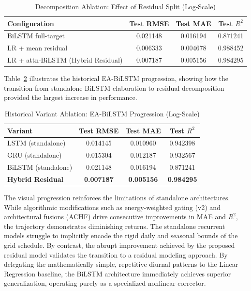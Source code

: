 \documentclass{ieeeaccess}
\begin{document}
\begin{table}[!t]
\caption{Decomposition Ablation: Effect of Residual Split (Log-Scale)}
\label{tab:ablation_decomp}
\centering
\begin{tabular}{lccc}
\toprule
Configuration & Test RMSE & Test MAE & Test $R^2$ \\
\midrule
BiLSTM full-target & 0.021148 & 0.016194 & 0.871241 \\
LR + mean residual & 0.006333 & 0.004678 & 0.988452 \\
LR + attn-BiLSTM (Hybrid Residual) & 0.007187 & 0.005156 & 0.984295 \\
\bottomrule
\end{tabular}
\end{table}

Table~\ref{tab:variant_ablation} illustrates the historical EA-BiLSTM progression, showing how the transition from standalone BiLSTM elaboration to residual decomposition provided the largest increase in performance.

\begin{table}[!t]
\caption{Historical Variant Ablation: EA-BiLSTM Progression (Log-Scale)}
\label{tab:variant_ablation}
\centering
\begin{tabular}{lccc}
\toprule
Variant & Test RMSE & Test MAE & Test $R^2$ \\
\midrule
LSTM (standalone) & 0.014145 & 0.010960 & 0.942398 \\
GRU (standalone) & 0.015304 & 0.012187 & 0.932567 \\
BiLSTM (standalone) & 0.021148 & 0.016194 & 0.871241 \\
\textbf{Hybrid Residual} & \textbf{0.007187} & \textbf{0.005156} & \textbf{0.984295} \\
\bottomrule
\end{tabular}
\end{table}

The visual progression reinforces the limitations of standalone architectures. While algorithmic modifications such as energy-weighted gating (v2) and architectural fusions (ACHF) drive consecutive improvements in MAE and $R^2$, the trajectory demonstrates diminishing returns. The standalone recurrent models struggle to implicitly encode the rigid daily and seasonal bounds of the grid schedule. By contrast, the abrupt improvement achieved by the proposed residual model validates the transition to a residual modeling approach. By delegating the mathematically simple, repetitive diurnal patterns to the Linear Regression baseline, the BiLSTM architecture immediately achieves superior generalization, operating purely as a specialized nonlinear corrector.
\end{document}
